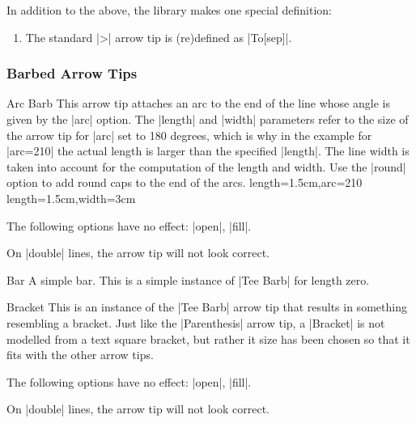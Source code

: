 In addition to the above, the library makes one special definition:

\begin{enumerate}
\item The standard |>| arrow tip is (re)defined as |To[sep]|.
\end{enumerate}


\subsubsection{Barbed Arrow Tips}

\begin{arrowtip}{Arc Barb}
  {
    This arrow tip attaches an arc to the end of the line whose angle
    is given by the |arc| option. The
    |length| and |width| parameters refer to the size of the arrow tip
    for |arc| set to 180 degrees, which is why in the example for 
    |arc=210| the actual length is larger than the specified
    |length|. The line width is taken into account 
    for the computation  of the length and width. Use the |round|
    option to add round caps to the end of the arcs.
  }
  {length=1.5cm,arc=210}
  {length=1.5cm,width=3cm}
  
  \begin{arrowexamples}
    \arrowexample[]
    \arrowexampledup[sep]
    \arrowexampledupdot[sep]
    \arrowexample[arc=120]
    \arrowexample[arc=270]
    \arrowexample[length=2pt]
    \arrowexample[length=2pt,width=5pt]
    \arrowexample[line width=2pt]
    \arrowexample[reversed]
    \arrowexample[round]
    \arrowexample[slant=.3]
    \arrowexample[left]
    \arrowexample[right]
    \arrowexample[red]
  \end{arrowexamples}
  The following options have no effect: |open|, |fill|.

  On |double| lines, the arrow tip will not look correct.
\end{arrowtip}


\begin{arrowtipsimple}{Bar}
  A simple bar. This is a simple instance of |Tee Barb| for length zero.
\end{arrowtipsimple}

\begin{arrowtip}{Bracket}
  {
    This is an instance of the |Tee Barb| arrow tip that results in
    something resembling a bracket. Just like the |Parenthesis| arrow
    tip, a |Bracket| is not modelled from a text square bracket, but
    rather it size has been chosen so that it fits with the other
    arrow tips.
  }
  {}
  {}
  
  \begin{arrowexamples}
    \arrowexample[]
    \arrowexampledup[sep]
    \arrowexampledupdot[sep]
    \arrowexample[reversed]
    \arrowexample[round]
    \arrowexample[slant=.3]
    \arrowexample[left]
    \arrowexample[right]
    \arrowexample[red]
  \end{arrowexamples}
  The following options have no effect: |open|, |fill|.

  On |double| lines, the arrow tip will not look correct.
\end{arrowtip}

